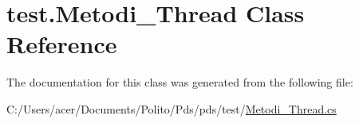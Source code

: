 \hypertarget{classtest_1_1_metodi___thread}{}\section{test.\+Metodi\+\_\+\+Thread Class Reference}
\label{classtest_1_1_metodi___thread}


The documentation for this class was generated from the following file\+:\begin{DoxyCompactItemize}
\item 
C\+:/\+Users/acer/\+Documents/\+Polito/\+Pds/pds/test/\hyperlink{_metodi___thread_8cs}{Metodi\+\_\+\+Thread.\+cs}\end{DoxyCompactItemize}
